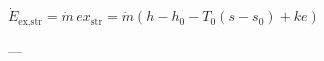 \( \dot{E}_{\text{ex,str}} = \dot{m} \, ex_{\text{str}} = \dot{m} \left( h - h_0 - T_0 (s - s_0) + ke \right) \)  

---